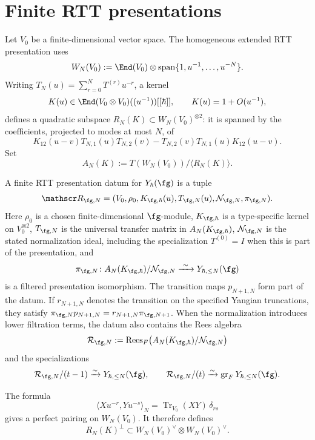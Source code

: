 \section{Finite RTT presentations}
\label{sec:exceptional-yangian-finite-rtt-windows}

Let $V_0$ be a finite-dimensional vector space.  The homogeneous
extended RTT presentation uses
\[
W_N(V_0):=\End(V_0)\otimes
\operatorname{span}\{1,u^{-1},\ldots,u^{-N}\}.
\]
Writing
$T_N(u)=\sum_{r=0}^{N}T^{(r)}u^{-r}$, a kernel
\[
K(u)\in\End(V_0\otimes V_0)((u^{-1}))[[\hbar]],
\qquad K(u)=1+O(u^{-1}),
\]
defines a quadratic subspace $R_N(K)\subset W_N(V_0)^{\otimes2}$:
it is spanned by the coefficients, projected to modes at most $N$, of
\begin{equation}\label{eq:exceptional-rtt-relation-map}
K_{12}(u-v)T_{N,1}(u)T_{N,2}(v)
-T_{N,2}(v)T_{N,1}(u)K_{12}(u-v).
\end{equation}
Set
\[
A_N(K):=T(W_N(V_0))/\langle R_N(K)\rangle.
\]

\begin{definition}
\label{def:finite-yangian-module-packet}
A finite RTT presentation datum for $Y_\hbar(\fg)$ is a tuple
\[
\mathscr R_{\fg,N}
=(V_0,\rho_0,K_{\fg,\hbar}(u),T_{\fg,N}(u),
\mathcal N_{\fg,N},\pi_{\fg,N}).
\]
Here $\rho_0$ is a chosen finite-dimensional $\fg$-module,
$K_{\fg,\hbar}$ is a type-specific kernel on $V_0^{\otimes2}$,
$T_{\fg,N}$ is the universal transfer matrix in $A_N(K_{\fg,\hbar})$,
$\mathcal N_{\fg,N}$ is the stated normalization ideal, including the
specialization $T^{(0)}=I$ when this is part of the presentation, and
\[
\pi_{\fg,N}\colon
A_N(K_{\fg,\hbar})/\mathcal N_{\fg,N}
\xrightarrow{\ \sim\ }Y_{\hbar,\leq N}(\fg)
\]
is a filtered presentation isomorphism.  The transition maps
$p_{N+1,N}$ form part of the datum.  If
$r_{N+1,N}$ denotes the transition on the specified Yangian
truncations, they satisfy
$\pi_{\fg,N}p_{N+1,N}=r_{N+1,N}\pi_{\fg,N+1}$.
When the normalization introduces lower filtration terms, the datum
also contains the Rees algebra
\[
\mathcal R_{\fg,N}
:=\operatorname{Rees}_F\!\left(
A_N(K_{\fg,\hbar})/\mathcal N_{\fg,N}\right)
\]
and the specializations
\[
\mathcal R_{\fg,N}/(t-1)\xrightarrow{\sim}
Y_{\hbar,\le N}(\fg),
\qquad
\mathcal R_{\fg,N}/(t)\xrightarrow{\sim}
\operatorname{gr}_F Y_{\hbar,\le N}(\fg).
\]
\end{definition}

\begin{proposition}
\label{prop:finite-rtt-trace-pairing-nondegenerate}
The formula
\[
\bigl\langle Xu^{-r},Yu^{-s}\bigr\rangle_N
=\operatorname{Tr}_{V_0}(XY)\,\delta_{rs}
\]
gives a perfect pairing on $W_N(V_0)$.  It therefore defines
\[
R_N(K)^\perp\subset W_N(V_0)^\vee\otimes W_N(V_0)^\vee.
\]
\end{proposition}

